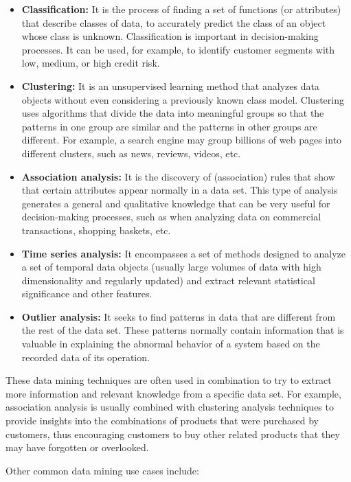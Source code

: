 \documentclass[
  letterpaper,
  DIV=11,
  numbers=noendperiod]{scrreprt}
\begin{document}
\begin{itemize}
\item
  \textbf{Classification:} It is the process of finding a set of
  functions (or attributes) that describe classes of data, to accurately
  predict the class of an object whose class is unknown. Classification
  is important in decision-making processes. It can be used, for
  example, to identify customer segments with low, medium, or high
  credit risk.
\item
  \textbf{Clustering:} It is an unsupervised learning method that
  analyzes data objects without even considering a previously known
  class model. Clustering uses algorithms that divide the data into
  meaningful groups so that the patterns in one group are similar and
  the patterns in other groups are different. For example, a search
  engine may group billions of web pages into different clusters, such
  as news, reviews, videos, etc.
\item
  \textbf{Association analysis:} It is the discovery of (association)
  rules that show that certain attributes appear normally in a data set.
  This type of analysis generates a general and qualitative knowledge
  that can be very useful for decision-making processes, such as when
  analyzing data on commercial transactions, shopping baskets, etc.
\item
  \textbf{Time series analysis:} It encompasses a set of methods
  designed to analyze a set of temporal data objects (usually large
  volumes of data with high dimensionality and regularly updated) and
  extract relevant statistical significance and other features.
\item
  \textbf{Outlier analysis:} It seeks to find patterns in data that are
  different from the rest of the data set. These patterns normally
  contain information that is valuable in explaining the abnormal
  behavior of a system based on the recorded data of its operation.
\end{itemize}

These data mining techniques are often used in combination to try to
extract more information and relevant knowledge from a specific data
set. For example, association analysis is usually combined with
clustering analysis techniques to provide insights into the combinations
of products that were purchased by customers, thus encouraging customers
to buy other related products that they may have forgotten or
overlooked.

Other common data mining use cases include:
\end{document}
